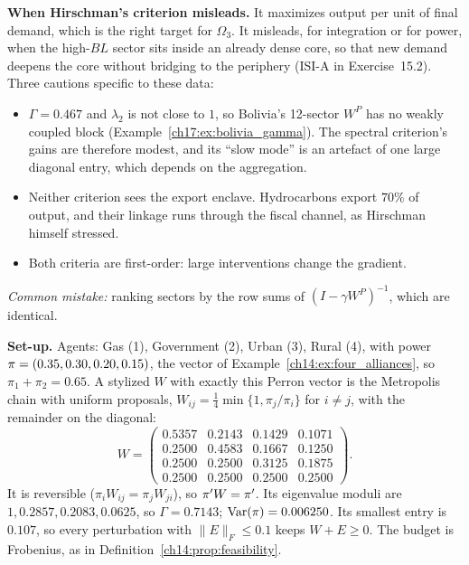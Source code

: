 \documentclass[../solutions_manual.tex]{subfiles}
\begin{document}
 \textbf{When Hirschman's criterion misleads.} It maximizes output per unit of final demand, which is the right target for $\Omega_3$. It misleads, for integration or for power, when the high-$BL$ sector sits inside an already dense core, so that new demand deepens the core without bridging to the periphery (ISI-A in Exercise~15.2). Three cautions specific to these data:
\begin{itemize}
\item $\Gamma = 0.467$ and $\lambda_2$ is not close to $1$, so Bolivia's 12-sector $W^P$ has no weakly coupled block (Example~\ref{ch17:ex:bolivia_gamma}). The spectral criterion's gains are therefore modest, and its ``slow mode'' is an artefact of one large diagonal entry, which depends on the aggregation.
\item Neither criterion sees the export enclave. Hydrocarbons export $70\%$ of output, and their linkage runs through the fiscal channel, as Hirschman himself stressed.
\item Both criteria are first-order: large interventions change the gradient.
\end{itemize}

\emph{Common mistake:} ranking sectors by the row sums of $(I - \gamma W^P)^{-1}$, which are identical.


\textbf{Set-up.} Agents: Gas (1), Government (2), Urban (3), Rural (4), with power $\pi = (0.35,\allowbreak 0.30,\allowbreak 0.20,\allowbreak 0.15)$, the vector of Example~\ref{ch14:ex:four_alliances}, so $\pi_1 + \pi_2 = 0.65$. A stylized $W$ with exactly this Perron vector is the Metropolis chain with uniform proposals, $W_{ij} = \frac14\min\{1, \pi_j/\pi_i\}$ for $i \ne j$, with the remainder on the diagonal:
\[
W = \begin{pmatrix}
0.5357 & 0.2143 & 0.1429 & 0.1071\\
0.2500 & 0.4583 & 0.1667 & 0.1250\\
0.2500 & 0.2500 & 0.3125 & 0.1875\\
0.2500 & 0.2500 & 0.2500 & 0.2500\end{pmatrix}.
\]
It is reversible ($\pi_iW_{ij} = \pi_jW_{ji}$), so $\pi'W = \pi'$. Its eigenvalue moduli are $1, 0.2857, 0.2083, 0.0625$, so $\Gamma = 0.7143$; $\operatorname{Var}(\pi) = 0.006250$. Its smallest entry is $0.107$, so every perturbation with $\|E\|_F \le 0.1$ keeps $W + E \ge 0$. The budget is Frobenius, as in Definition~\ref{ch14:prop:feasibility}.
\end{document}
